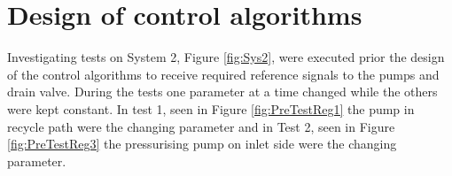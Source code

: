 \newpage


\section{Design of control algorithms}

Investigating tests on System 2, Figure \ref{fig:Sys2}, were executed prior the design of the control algorithms to receive required reference signals to the pumps and drain valve. During the tests one parameter at a time changed while the others were kept constant. In test 1, seen in Figure \ref{fig:PreTestReg1} the pump in recycle path were the changing parameter and in Test 2, seen in Figure \ref{fig:PreTestReg3} the pressurising pump on inlet side were the changing parameter. 








